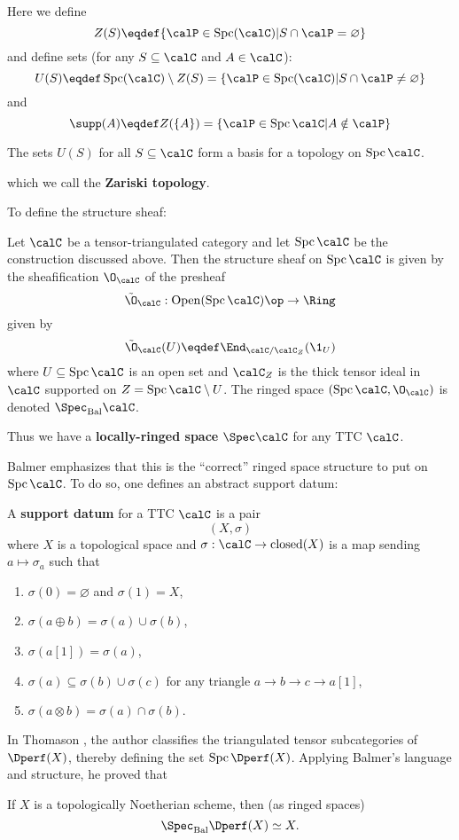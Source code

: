 \documentclass[12pt]{article}
\DeclareMathOperator{\Spc}{Spc}
\begin{document}
	Here we define
	\[Z(S)\eqdef\{\calP\in\Spc(\calC)|S\cap\calP=\varnothing\}\]
	and define sets (for any $S\subseteq\calC$ and $A\in \calC$):
	\[U(S)\eqdef \Spc(\calC)\setminus Z(S)=\{\calP\in\Spc(\calC)|S\cap \calP\ne\varnothing\}\]
	and
	\[\supp(A)\eqdef Z(\{A\})=\{\calP\in\Spc\calC|A\notin \calP\}\]
	\begin{lem}
		The sets $U(S)$ for all $S\subseteq\calC$ form a basis for a topology on $\Spc\calC$.
	\end{lem}
	which we call the \textbf{Zariski topology}.

	To define the structure sheaf:
	\begin{defn}
		Let $\calC$ be a tensor-triangulated category and let $\Spc\calC$ be the construction discussed above. Then the structure sheaf on $\Spc\calC$ is given by the 
		sheafification $\O_\calC$ of the presheaf 
		\[\tilde\O_\calC:\operatorname{Open}(\Spc\calC)\op\to \Ring\]
		given by 
		\[\tilde\O_\calC(U)\eqdef \End_{\calC/\calC_Z}(\1_U)\]
		where $U\subseteq\Spc\calC$ is an open set and $\calC_Z$ is the thick tensor ideal in $\calC$ supported 
		on $Z=\Spc\calC\setminus U$. The ringed space $(\Spc \calC,\O_\calC)$ is denoted $\Spec_\text{Bal} \calC$.
	\end{defn}
	Thus we have a \textbf{locally-ringed space} $\Spec\calC$ for any TTC $\calC$.

	Balmer emphasizes that this is the ``correct'' ringed space structure to put on $\Spc\calC$. To do so, one defines an abstract support datum:
	\begin{defn}
		A \textbf{support datum} for a TTC $\calC$ is a pair 
		\[(X,\sigma)\]
		where $X$ is a topological space and $\sigma:\calC\to \operatorname{closed}(X)$ is a map sending $a\mapsto\sigma_a$ such that 
		\begin{enumerate}
			\item $\sigma(0)=\varnothing$ and $\sigma(1)=X$,
			\item $\sigma(a\oplus b)=\sigma(a)\cup\sigma(b)$,
			\item $\sigma (a[1])=\sigma(a)$,
			\item $\sigma(a)\subseteq \sigma(b)\cup\sigma(c)$ for any triangle $a\to b\to c\to a[1]$,
			\item $\sigma(a\otimes b)=\sigma(a)\cap\sigma(b).$
		\end{enumerate}
	\end{defn}
	In Thomason \cite{thomason}, the author classifies the triangulated tensor subcategories 
	of $\Dperf(X)$, thereby defining the set $\Spc\Dperf(X)$. Applying Balmer's language and structure, he proved that 
	\begin{thm}
		If $X$ is a topologically Noetherian scheme, then (as ringed spaces)
		\[\Spec_\text{Bal}\Dperf(X)\simeq X.\]
	\end{thm}
\end{document}
